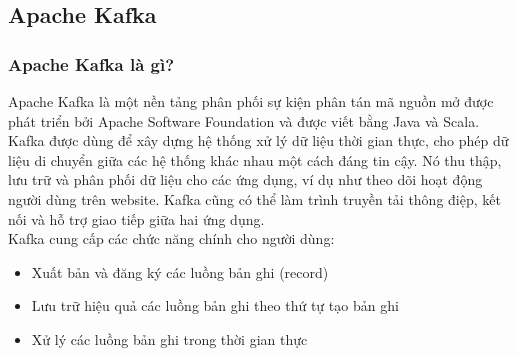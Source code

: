 \subsection{Apache Kafka}
\subsubsection{Apache Kafka là gì?}
Apache Kafka là một nền tảng phân phối sự kiện phân tán mã nguồn mở được phát triển bởi Apache Software Foundation và được viết bằng Java và Scala.\\
Kafka được dùng để xây dựng hệ thống xử lý dữ liệu thời gian thực, cho phép dữ liệu di chuyển giữa các hệ thống khác nhau một cách đáng tin cậy. Nó thu thập, lưu trữ và phân phối dữ liệu cho các ứng dụng, ví dụ như theo dõi hoạt động người dùng trên website. Kafka cũng có thể làm trình truyền tải thông điệp, kết nối và hỗ trợ giao tiếp giữa hai ứng dụng.\\
Kafka cung cấp các chức năng chính cho người dùng:
\begin{itemize}
    \item Xuất bản và đăng ký các luồng bản ghi (record)
    \item Lưu trữ hiệu quả các luồng bản ghi theo thứ tự tạo bản ghi
    \item Xử lý các luồng bản ghi trong thời gian thực
\end{itemize}
